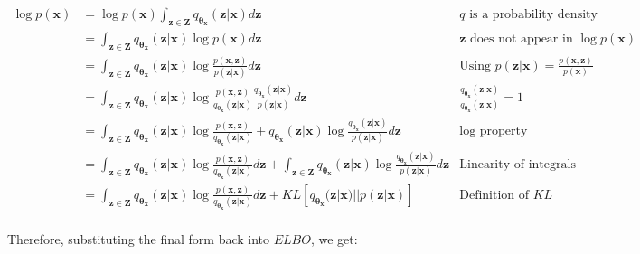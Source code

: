             \begin{align*}
              \log p(\bm{x}) &= \log p(\bm{x}) \int_{\bm{z} \in \bm{Z}} q_{\bm{\theta_x}}(\bm{z}|\bm{x}) d\bm{z} & \text{$q$ is a probability density function}\\
                &= \int_{\bm{z} \in \bm{Z}} q_{\bm{\theta_x}}(\bm{z}|\bm{x}) \log p(\bm{x}) d\bm{z} & \text{$\bm{z}$ does not appear in $\log p(\bm{x})$}\\
                &= \int_{\bm{z} \in \bm{Z}} q_{\bm{\theta_x}}(\bm{z}|\bm{x}) \log \frac{p(\bm{x}, \bm{z})}{p(\bm{z} | \bm{x})} d\bm{z} & \text{Using $p(\bm{z} | \bm{x}) = \frac{p(\bm{x}, \bm{z})}{p(\bm{x})}$}\\
                &= \int_{\bm{z} \in \bm{Z}} q_{\bm{\theta_x}}(\bm{z}|\bm{x}) \log \frac{p(\bm{x}, \bm{z})}{q_{\bm{\theta_x}}(\bm{z}|\bm{x})}\frac{q_{\bm{\theta_x}}(\bm{z}|\bm{x})}{p(\bm{z} | \bm{x})} d\bm{z} & \frac{q_{\bm{\theta_x}}(\bm{z}|\bm{x})}{q_{\bm{\theta_x}}(\bm{z}|\bm{x})} = 1\\
                &= \int_{\bm{z} \in \bm{Z}} q_{\bm{\theta_x}}(\bm{z}|\bm{x}) \log \frac{p(\bm{x}, \bm{z})}{q_{\bm{\theta_x}}(\bm{z}|\bm{x})} + q_{\bm{\theta_x}}(\bm{z}|\bm{x}) \log \frac{q_{\bm{\theta_x}}(\bm{z}|\bm{x})}{p(\bm{z} | \bm{x})} d\bm{z} & \text{$\log$ property}\\
                &= \int_{\bm{z} \in \bm{Z}} q_{\bm{\theta_x}}(\bm{z}|\bm{x}) \log \frac{p(\bm{x}, \bm{z})}{q_{\bm{\theta_x}}(\bm{z}|\bm{x})} d\bm{z} + \int_{\bm{z} \in \bm{Z}} q_{\bm{\theta_x}}(\bm{z}|\bm{x}) \log \frac{q_{\bm{\theta_x}}(\bm{z}|\bm{x})}{p(\bm{z} | \bm{x})} d\bm{z} & \text{Linearity of integrals}\\
                &= \int_{\bm{z} \in \bm{Z}} q_{\bm{\theta_x}}(\bm{z}|\bm{x}) \log \frac{p(\bm{x}, \bm{z})}{q_{\bm{\theta_x}}(\bm{z}|\bm{x})}d\bm{z} + KL\left[q_{\bm{\theta_x}}(\bm{z}|\bm{x}) || p(\bm{z}|\bm{x})\right] & \text{Definition of $KL$}\\
            \end{align*}
            
            Therefore, substituting the final form back into $ELBO$, we get:
            
